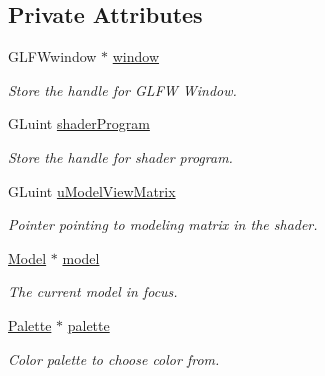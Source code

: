\subsection*{Private Attributes}
\begin{DoxyCompactItemize}
\item 
G\+L\+F\+Wwindow $\ast$ \hyperlink{classcft_1_1Crafter_a70b8292b32d9eda7b3ce9e8c86161042}{window}\hypertarget{classcft_1_1Crafter_a70b8292b32d9eda7b3ce9e8c86161042}{}\label{classcft_1_1Crafter_a70b8292b32d9eda7b3ce9e8c86161042}

\begin{DoxyCompactList}\small\item\em Store the handle for G\+L\+FW Window. \end{DoxyCompactList}\item 
G\+Luint \hyperlink{classcft_1_1Crafter_a9c0adedc2bd7aeb3a1415eb47ea11e04}{shader\+Program}\hypertarget{classcft_1_1Crafter_a9c0adedc2bd7aeb3a1415eb47ea11e04}{}\label{classcft_1_1Crafter_a9c0adedc2bd7aeb3a1415eb47ea11e04}

\begin{DoxyCompactList}\small\item\em Store the handle for shader program. \end{DoxyCompactList}\item 
G\+Luint \hyperlink{classcft_1_1Crafter_a4d5ce47319d35e5e4978bc19682fea6d}{u\+Model\+View\+Matrix}\hypertarget{classcft_1_1Crafter_a4d5ce47319d35e5e4978bc19682fea6d}{}\label{classcft_1_1Crafter_a4d5ce47319d35e5e4978bc19682fea6d}

\begin{DoxyCompactList}\small\item\em Pointer pointing to modeling matrix in the shader. \end{DoxyCompactList}\item 
\hyperlink{classcft_1_1Model}{Model} $\ast$ \hyperlink{classcft_1_1Crafter_a42504406d07a4114368ffdcf6de2b33f}{model}\hypertarget{classcft_1_1Crafter_a42504406d07a4114368ffdcf6de2b33f}{}\label{classcft_1_1Crafter_a42504406d07a4114368ffdcf6de2b33f}

\begin{DoxyCompactList}\small\item\em The current model in focus. \end{DoxyCompactList}\item 
\hyperlink{classcft_1_1Palette}{Palette} $\ast$ \hyperlink{classcft_1_1Crafter_a358b5590166bf9ed437462a922b806f5}{palette}\hypertarget{classcft_1_1Crafter_a358b5590166bf9ed437462a922b806f5}{}\label{classcft_1_1Crafter_a358b5590166bf9ed437462a922b806f5}

\begin{DoxyCompactList}\small\item\em Color palette to choose color from. \end{DoxyCompactList}\end{DoxyCompactItemize}
